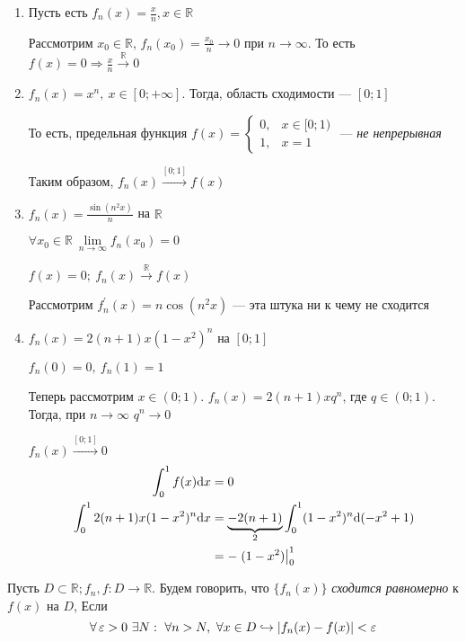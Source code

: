 \documentclass[a4paper, 10pt]{article}
\begin{document}
\begin{enumerate}
    \item Пусть есть $f_n(x)=\displaystyle\frac{x}{n},x\in\mathbb{R}$

    Рассмотрим $x_0\in\mathbb{R}$, $f_n(x_0)=\displaystyle\frac{x_0}{n}\longrightarrow 0$ при $n\to\infty$. То есть $f(x)=0\Longrightarrow \displaystyle\frac{x}{n}\overset{\mathbb{R}}{\longrightarrow}0$

    \item $f_n(x)=x^n,\ x\in[0;+\infty]$. Тогда, область сходимости — $[0;1]$

    То есть, предельная функция $f(x)=\begin{cases}
        0,&x\in[0;1)\\
        1,&x=1
    \end{cases}$ — \textit{не непрерывная}

    Таким образом, $f_n(x)\overset{[0;1]}{\longrightarrow}f(x)$

    \item $f_n(x)=\displaystyle\frac{\sin{(n^2x)}}{n}$ на $\mathbb{R}$

    $\forall x_0\in\mathbb{R}\ \lim\limits_{n\to\infty}f_n(x_0)=0$

    $f(x)=0;\ f_n(x)\overset{\mathbb{R}}{\longrightarrow}f(x)$

    Рассмотрим $f_n^{\prime}(x)=n\cos{(n^2x)}$ — эта штука ни к чему не сходится

    \item $f_n(x)=2(n+1)x(1-x^2)^n$ на $[0;1]$

    $f_n(0)=0,\ f_n(1)=1$

    Теперь рассмотрим $x\in(0;1)$. $f_n(x)=2(n+1)xq^n$, где $q\in(0;1)$. Тогда, при $n\to\infty$ $q^n\longrightarrow0$

    $f_n(x)\overset{[0;1]}{\longrightarrow}0$
    \begin{equation*}
        \begin{aligned}
            \int_0^1f(x)\text{d}x&=0\\
            \int_0^1 2(n+1)x(1-x^2)^n\text{d}x&=\underbrace{-2(n+1)}_{2}\int_0^1 (1-x^2)^n\text{d}(-x^2+1)\\
            &=-\left.(1-x^2)\right\vert_0^1
        \end{aligned}
    \end{equation*}
\end{enumerate}

 Пусть $D\subset\mathbb{R};f_n,f:D\longrightarrow\mathbb{R}$. Будем говорить, что $\{f_n(x)\}$ \textit{сходится равномерно} к $f(x)$ на $D$, Если
\begin{equation*}
    \forall\operatorname{\varepsilon}>0\ \exists N:\ \forall n>N,\ \forall x\in D\hookrightarrow|f_n(x)-f(x)|<\operatorname{\varepsilon}
\end{equation*}
\end{document}
